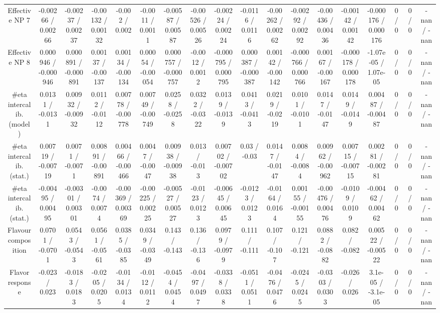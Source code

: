 \documentclass[10pt]{article}
\begin{document}
\begin{table}[htbp]
\begin{center}
\begin{tabular}{|c|c|c|c|c|c|c|c|c|c|c|c|c|c|c|c|c|c|}
  Effective NP 7 & -0.00266 / 0.00266 & -0.00237 / 0.00237 & -0.00132 / 0.00132 & -0.002 / 0.002 & -0.0011 / 0.0011 & -0.00587 / 0.00587 & -0.00526 / 0.00526 & -0.00224 / 0.00224 & -0.0116 / 0.0116 & -0.00262 / 0.00262 & -0.00292 / 0.00292 & -0.00436 / 0.00436 & -0.00142 / 0.00142 & -0.000176 / 0.000176 & 0 / 0 & 0 / 0 & -nan / -nan \\ 
  Effective NP 8 & 0.000946 / -0.000946 & 0.000891 / -0.000891 & 0.00137 / -0.00137 & 0.00134 / -0.00134 & 0.00054 / -0.00054 & 0.000757 / -0.000757 & -0.0012 / 0.0012 & -0.000795 / 0.000795 & 0.000387 / -0.000387 & 0.00142 / -0.00142 & -0.000766 / 0.000766 & 0.00167 / -0.00167 & -0.000178 / 0.000178 & -1.07e-05 / 1.07e-05 & 0 / 0 & 0 / 0 & -nan / -nan \\ 
  #eta intercalib. (model) & 0.0131 / -0.0131 & 0.00932 / -0.00932 & 0.0112 / -0.0112 & 0.00778 / -0.00778 & 0.00749 / -0.00749 & 0.0258 / -0.0258 & 0.0322 / -0.0322 & 0.0139 / -0.0139 & 0.0413 / -0.0413 & 0.0219 / -0.0219 & 0.0101 / -0.0101 & 0.0147 / -0.0147 & 0.0149 / -0.0149 & 0.00487 / -0.00487 & 0 / 0 & 0 / 0 & -nan / -nan \\ 
  #eta intercalib. (stat.) & 0.00719 / -0.00719 & 0.0071 / -0.0071 & 0.00891 / -0.00891 & 0.00466 / -0.00466 & 0.0047 / -0.0047 & 0.00938 / -0.00938 & 0.013 / -0.013 & 0.00702 / -0.00702 & 0.03 / -0.03 & 0.0147 / -0.0147 & 0.0084 / -0.0084 & 0.00962 / -0.00962 & 0.00715 / -0.00715 & 0.00281 / -0.00281 & 0 / 0 & 0 / 0 & -nan / -nan \\ 
  #eta intercalib. (stat.) & -0.00495 / 0.00495 & -0.00301 / 0.00301 & -0.0074 / 0.0074 & -0.00369 / 0.00369 & -0.00225 / 0.00225 & -0.00527 / 0.00527 & -0.0123 / 0.0123 & -0.00645 / 0.00645 & -0.0123 / 0.0123 & -0.0164 / 0.0164 & 0.00155 / -0.00155 & -0.00476 / 0.00476 & -0.0109 / 0.0109 & -0.00462 / 0.00462 & 0 / 0 & 0 / 0 & -nan / -nan \\ 
  Flavour composition & 0.0701 / -0.0701 & 0.0543 / -0.0543 & 0.0561 / -0.0561 & 0.0385 / -0.0385 & 0.0349 / -0.0349 & 0.143 / -0.143 & 0.136 / -0.136 & 0.0979 / -0.0979 & 0.111 / -0.111 & 0.107 / -0.107 & 0.121 / -0.121 & 0.0882 / -0.0882 & 0.082 / -0.082 & 0.00522 / -0.00522 & 0 / 0 & 0 / 0 & -nan / -nan \\ 
  Flavor response & -0.023 / 0.023 & -0.0183 / 0.0183 & -0.0205 / 0.0205 & -0.0134 / 0.0134 & -0.0112 / 0.0112 & -0.0454 / 0.0454 & -0.0497 / 0.0497 & -0.0338 / 0.0338 & -0.0511 / 0.0511 & -0.0476 / 0.0476 & -0.0245 / 0.0245 & -0.0303 / 0.0303 & -0.026 / 0.026 & 3.1e-05 / -3.1e-05 & 0 / 0 & 0 / 0 & -nan / -nan \\ 

\end{tabular}
\end{center}
\end{table}
\end{document}
